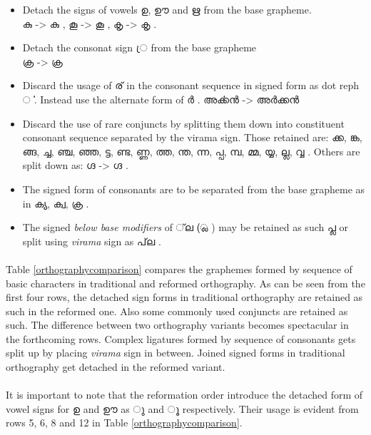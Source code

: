 \documentclass[10pt]{article}
\begin{document}
\begin{itemize}
\item
Detach the signs of vowels {\manjari ഉ, ഊ and ഋ } from the base grapheme.\\
{\manjari കു } -> {\raghu കു } ,
{\manjari കൂ } -> {\raghu കൂ } ,
{\manjari കൃ } -> {\raghu കൃ } .
\item 
Detach the consonat sign {\manjari  ്ര } from the base grapheme \\
{\manjari ക്ര  } -> {\raghu ക്ര  } 
\item
Discard the usage of {\manjari ര് } in the consonant sequence in signed form as dot reph {\manjari ൎ }. Instead use the alternate form of {\manjari ർ }. {\manjari അൎക്കൻ } -> {\manjari അർക്കൻ }

\item
Discard the use of rare conjuncts by splitting them down into constituent consonant sequence separated by the virama sign. Those retained are: {\manjari ക്ക, ങ്ക, ങ്ങ, ച്ച, ഞ്ച, ഞ്ഞ, ട്ട, ണ്ട, ണ്ണ, ത്ത, ന്ത, ന്ന, പ്പ, മ്പ, മ്മ, യ്യ, ല്ല, വ്വ }. Others are split down as: {\manjari ഗ്ദ } -> {\raghu ഗ്ദ }. 

\item
The signed form of consonants are to be separated from the base grapheme as in {\raghu ക്യ, ക്വ, ക്ര }.

\item
The signed \textit{below base modifiers} of {\manjari  ്‌ല  (്ല )  } may be retained as such {\manjari പ്ല } or split using \textit{virama} sign as {\manjari  പ്‌ല }.

\end{itemize}

\paragraph{}
Table \ref{orthographycomparison} compares the graphemes formed by sequence of basic characters in traditional and reformed orthography. As can be seen from the first four rows, the detached sign forms in traditional orthography are retained as such in the reformed one. Also some commonly used conjuncts are retained as such. The difference between two orthography variants becomes spectacular in the forthcoming rows. Complex ligatures formed by sequence of consonants gets split up by placing \textit{virama} sign in between. Joined signed forms in traditional orthography get detached in the reformed variant.

\paragraph{}
It is important to note that the reformation order introduce the detached form of vowel signs for {\manjari ഉ } and {\manjari ഊ } as {\manjari ു } and {\manjari ൂ } respectively. Their usage is evident from rows 5, 6, 8 and 12 in Table \ref{orthographycomparison}.
\end{document}
